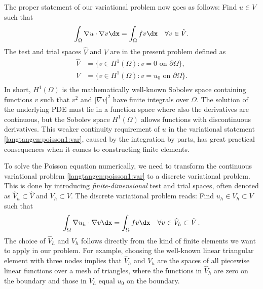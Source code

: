 The proper statement of
our variational problem now goes as follows: 
Find $u \in V$ such that
\begin{equation} \label{langtangen:poisson1:var}
  \int_{\Omega} \nabla u \cdot \nabla v \dx =
  \int_{\Omega} fv \dx
  \quad \forall v \in \hat{V}.
\end{equation}
The test and trial spaces $\hat{V}$ and $V$ are in the present
problem defined as
\begin{displaymath}
  \begin{split}
    \hat{V} &= \{v \in H^1(\Omega) : v = 0 \mbox{ on } \partial\Omega\}, \\
     V      &= \{v \in H^1(\Omega) : v = u_0 \mbox{ on } \partial\Omega\}. \\
  \end{split}
\end{displaymath}
In short, 
$H^1(\Omega)$ is the mathematically well-known Sobolev space containing
functions $v$ such that $v^2$ and $|\nabla v|^2$ have finite integrals over
$\Omega$. The solution of the underlying
PDE
must lie in a function space where also the derivatives are continuous,
but the Sobolev space $H^1(\Omega)$ allows functions with discontinuous
derivatives.
This weaker continuity requirement of $u$ in the variational statement
\eqref{langtangen:poisson1:var}, caused by the integration by parts, has
great practical consequences when it comes to constructing
finite elements.

To solve the Poisson equation numerically, we need to transform the
continuous variational problem \eqref{langtangen:poisson1:var}
to a discrete variational
problem. This is done by introducing \emph{finite-dimensional} test and
trial spaces, often denoted as
$\hat{V}_h\subset\hat{V}$ and $V_h\subset{V}$. The
discrete variational problem reads: 
Find $u_h \in V_h \subset V$ such that
\begin{equation} \label{langtangen:poisson1:vard}
  \int_{\Omega} \nabla u_h \cdot \nabla v \dx =
  \int_{\Omega} fv \dx
  \quad \forall v \in \hat{V}_h \subset \hat{V}\langtangenep
\end{equation}
The choice of $\hat{V}_h$ and $V_h$ follows directly from the
kind of finite elements we want to apply in our problem. For example,
choosing the well-known linear triangular element with three nodes
implies that
$\hat V_h$ and $V_h$ are the spaces of all piecewise linear functions 
over a mesh of triangles,
where the functions in $\hat V_h$
are zero on the boundary
and those in $V_h$ equal $u_0$ on the boundary.

